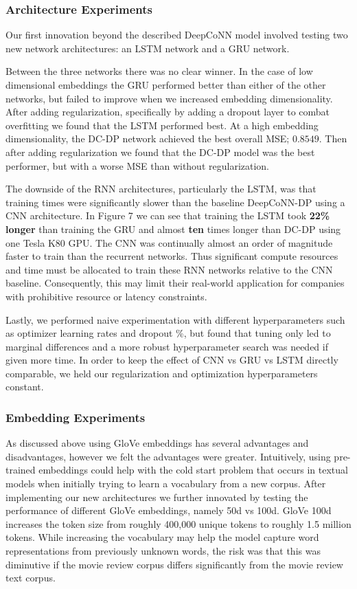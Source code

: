 \documentclass[10pt, twocolumn, letterpaper]{article}
\begin{document}
\subsubsection{Architecture Experiments}
Our first innovation beyond the described DeepCoNN model involved testing two new network architectures: an LSTM network and a GRU network.

Between the three networks there was no clear winner. In the case of low dimensional embeddings the GRU performed better than either of the other networks, but failed to improve when we increased embedding dimensionality. After adding regularization, specifically by adding a dropout layer to combat overfitting we found that the LSTM performed best. At a high embedding dimensionality, the DC-DP network achieved the best overall MSE; $0.8549$. Then after adding regularization we found that the DC-DP model was the best performer, but with a worse MSE than without regularization.

The downside of the RNN architectures, particularly the LSTM, was that training times were significantly slower than the baseline DeepCoNN-DP using a CNN architecture. In Figure 7 we can see that training the LSTM took \textbf{22\% longer} than training the GRU and almost \textbf{ten} times longer than DC-DP using one Tesla K80 GPU. The CNN was continually almost an order of magnitude faster to train than the recurrent networks. Thus significant compute resources and time must be allocated to train these RNN networks relative to the CNN baseline. Consequently, this may limit their real-world application for companies with prohibitive resource or latency constraints.

Lastly, we performed naive experimentation with different hyperparameters such as optimizer learning rates and dropout \%, but found that tuning only led to marginal differences and a more robust hyperparameter search was needed if given more time. In order to keep the effect of CNN vs GRU vs LSTM directly comparable, we held our regularization and optimization hyperparameters constant.

\subsubsection{Embedding Experiments}
As discussed above using GloVe embeddings has several advantages and disadvantages, however we felt the advantages were greater. Intuitively, using pre-trained embeddings could help with the cold start problem that occurs in textual models when initially trying to learn a vocabulary from a new corpus. After implementing our new architectures we further innovated by testing the performance of different GloVe embeddings, namely 50d vs 100d. GloVe 100d increases the token size from roughly 400,000 unique tokens to roughly 1.5 million tokens. While increasing the vocabulary may help the model capture word representations from previously unknown words, the risk was that this was diminutive if the movie review corpus differs significantly from the movie review text corpus.
\end{document}
